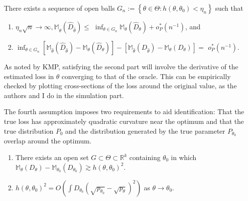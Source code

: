 
\begin{assumption}[A3, KMP]
    \label{a:3}
    There exists a sequence of open balls $G_{n}:=\left\{\theta \in \Theta: h\left(\theta, \theta_{0}\right)<\eta_{n}\right\}$ such that
    \begin{enumerate}
        \item $\eta_{n} \sqrt{n} \rightarrow \infty, \mathbb{M}_{\hat{\theta}}\left(\hat{D}_{\hat{\theta}}\right) \leq$ $\inf _{\theta \in G_{n}} \mathbb{M}_{\theta}\left(\hat{D}_{\theta}\right)+o_{P}^{*}\left(n^{-1}\right)$, and
        \item $\inf _{\theta \in G_{n}}\left[\mathbb{M}_{\hat{\theta}}\left(\hat{D}_{\hat{\theta}}\right)-\mathbb{M}_{\theta}\left(\hat{D}_{\theta}\right)\right]-\left[\mathbb{M}_{\hat{\theta}}\left(D_{\hat{\theta}}\right)-\mathbb{M}_{\theta}\left(D_{\theta}\right)\right]=$ $o_{P}^{*}\left(n^{-1}\right)$.
    \end{enumerate}
\end{assumption}

As noted by KMP, satisfying the second part will involve the derivative of the estimated loss in $\theta$ converging to that of the oracle. %
This can be empirically checked by plotting cross-sections of the loss around the original value, as the authors and I do in the simulation part.

The fourth assumption imposes two requirements to aid identification:
That the true loss has approximately quadratic curvature near the optimum and that the true distribution $P_{0}$ and the distribution generated by the true parameter $P_{\theta_0}$ overlap around the optimum.

\begin{assumption}[A4, KMP]
    \label{a:4}
    \begin{enumerate}
        \item There exists an open set $G \subset \Theta \subset \mathbb{R}^{k}$ containing $\theta_{0}$ in which $\mathbb{M}_{\theta}\left(D_{\theta}\right)-\mathbb{M}_{\theta_{0}}\left(D_{\theta_{0}}\right) \gtrsim h\left(\theta, \theta_{0}\right)^{2}$. 
        \item $h\left(\theta, \theta_{0}\right)^{2}=O\left(\int D_{\theta_{0}}\left(\sqrt{p_{\theta_{0}}}-\sqrt{p_{\theta}}\right)^{2}\right)$ as $\theta \rightarrow \theta_{0}$.
    \end{enumerate}
\end{assumption}

